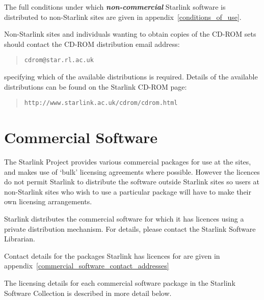 \documentclass[twoside,11pt]{article}
\newcommand{\htmladdnormallink}[2]{#1}
\newcommand{\htmlref}[2]{#1}
\newcommand{\latexhtml}[2]{#1}
\newcommand{\xlabel}[1]{}
\renewcommand{\_}{\texttt{\symbol{95}}}
\begin{document}
The full conditions under which \textbf{\textit{non-commercial\/}}
Starlink software is distributed to non-Starlink sites are given in
\latexhtml{appendix~\ref{conditions_of_use}.}{the \htmlref{Conditions
of Use}{conditions_of_use} section.}

Non-Starlink sites and individuals wanting to obtain copies of the CD-ROM
sets should contact the CD-ROM distribution email address:

\begin{quote}
\htmladdnormallink{\texttt{cdrom@star.rl.ac.uk}}{mailto:cdrom@star.rl.ac.uk}
\end{quote}

specifying which of the available distributions is required.  Details
of the available distributions can be found on the Starlink CD-ROM
page:

\begin{quote}
\htmladdnormallink{\texttt{http://www.starlink.ac.uk/cdrom/cdrom.html}}{http://www.starlink.ac.uk/cdrom/cdrom.html}
\end{quote}

\section{\xlabel{commercial_software}Commercial Software}
\label{commercial_software}

The Starlink Project provides various commercial packages for use at the
sites, and makes use of `bulk' licensing agreements where possible.
However the licences do not permit Starlink to distribute the software
outside Starlink sites so users at non-Starlink sites who wish to use a
particular package will have to make their own licensing arrangements.

Starlink distributes the commercial software for which it has licences
using a private distribution mechanism.  For details, please contact the
Starlink Software Librarian.

Contact details for the packages Starlink has licences for are given in
\latexhtml{appendix~\ref{commercial_software_contact_addresses}}{the
\htmlref{Commercial software contact addresses}{commercial_software_contact_addresses}
section.}

The licensing details for each commercial software package in the Starlink
Software Collection is described in more detail below.
\end{document}
